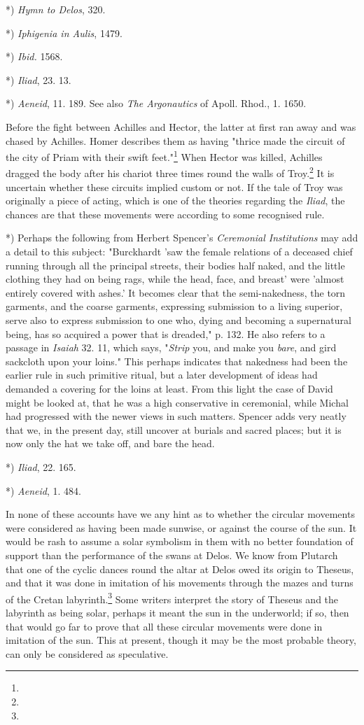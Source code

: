 \documentclass[a4paper, 11pt, oneside, polutonikogreek, english]{article}
\begin{document}
*) \emph{Hymn to Delos}, 320.

*) \emph{Iphigenia in Aulis}, 1479.

*) \emph{Ibid.} 1568.

*) \emph{Iliad}, 23. 13.

*) \emph{Aeneid}, 11. 189. See also \emph{The Argonautics} of Apoll. Rhod., 1. 1650.

Before the fight between Achilles and Hector, the latter at first ran away and was chased by Achilles. Homer describes them as having "thrice made the circuit of the city of Priam with their swift feet."\footnote{} When Hector was killed, Achilles dragged the body after his chariot three times round the walls of Troy.\footnote{} It is uncertain whether these circuits implied custom or not. If the tale of Troy was originally a piece of acting, which is one of the theories regarding the \emph{Iliad}, the chances are that these movements were according to some recognised rule.

*) Perhaps the following from Herbert Spencer's \emph{Ceremonial Institutions} may add a detail to this subject: "Burckhardt 'saw the female relations of a deceased chief running through all the principal streets, their bodies half naked, and the little clothing they had on being rags, while the head, face, and breast' were 'almost entirely covered with ashes.' It becomes clear that the semi-nakedness, the torn garments, and the coarse garments, expressing submission to a living superior, serve also to express submission to one who, dying and becoming a supernatural being, has so acquired a power that is dreaded," p. 132. He also refers to a passage in \emph{Isaiah} 32. 11, which says, "\emph{Strip} you, and make you \emph{bare}, and gird sackcloth upon your loins." This perhaps indicates that nakedness had been the earlier rule in such primitive ritual, but a later development of ideas had demanded a covering for the loins at least. From this light the case of David might be looked at, that he was a high conservative in ceremonial, while Michal had progressed with the newer views in such matters. Spencer adds very neatly that we, in the present day, still uncover at burials and sacred places; but it is now only the hat we take off, and bare the head.

*) \emph{Iliad}, 22. 165.

*) \emph{Aeneid}, 1. 484.

In none of these accounts have we any hint as to whether the circular movements were considered as having been made sunwise, or against the course of the sun. It would be rash to assume a solar symbolism in them with no better foundation of support than the performance of the swans at Delos. We know from Plutarch that one of the cyclic dances round the altar at Delos owed its origin to Theseus, and that it was done in imitation of his movements through the mazes and turns of the Cretan labyrinth.\footnote{} Some writers interpret the story of Theseus and the labyrinth as being solar, perhaps it meant the sun in the underworld; if so, then that would go far to prove that all these circular movements were done in imitation of the sun. This at present, though it may be the most probable theory, can only be considered as speculative.
\end{document}
